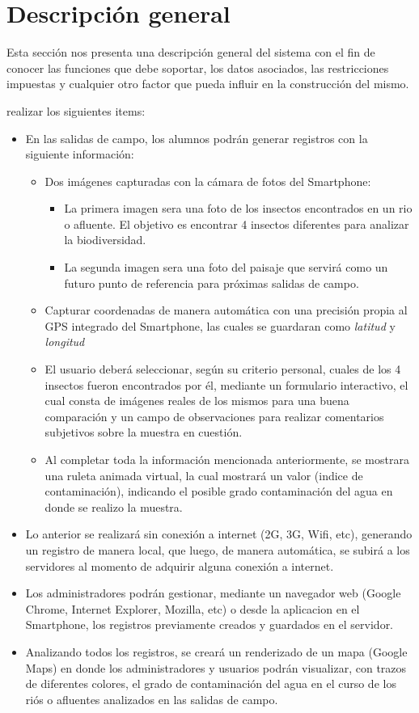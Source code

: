  \section{Descripción general}

    Esta sección nos presenta una descripción general del sistema con el fin de conocer las funciones que debe soportar, los datos asociados, las restricciones impuestas y cualquier otro factor que pueda influir en la construcción del mismo.

    realizar los siguientes items:
\begin{itemize}
    \item En las salidas de campo, los alumnos podrán generar registros con la siguiente información:
    \begin{itemize}
        \item Dos imágenes capturadas con la cámara de fotos del Smartphone:
        \begin{itemize}
            \item La primera imagen sera una foto de los insectos encontrados en un rio o afluente. El objetivo es encontrar 4 insectos diferentes para analizar la biodiversidad.
            \item La segunda imagen sera una foto del paisaje que servirá como un futuro punto de referencia para próximas salidas de campo. 
        \end{itemize}
        \item Capturar coordenadas de manera automática con una precisión propia al GPS integrado del Smartphone, las cuales se guardaran como \emph{latitud} y \emph{longitud}
        \item El usuario deberá seleccionar, según su criterio personal, cuales de los 4 insectos fueron encontrados por él, mediante un formulario interactivo, el cual consta de imágenes reales de los mismos para una buena comparación y un campo de observaciones para realizar comentarios subjetivos sobre la muestra en cuestión.
        \item Al completar toda la información mencionada anteriormente, se mostrara una ruleta animada virtual, la cual mostrará un valor (indice de contaminación), indicando el posible grado contaminación del agua en donde se realizo la muestra.
    \end{itemize}
    \item Lo anterior se realizará sin conexión a internet (2G, 3G, Wifi, etc), generando un registro de manera local, que luego, de manera automática, se subirá a los servidores al momento de adquirir alguna conexión a internet.
    \item Los administradores podrán gestionar, mediante un navegador web (Google Chrome, Internet Explorer, Mozilla, etc) o desde la aplicacion en el Smartphone, los registros previamente creados y guardados en el servidor. 
    \item Analizando todos los registros, se creará un renderizado de un mapa  (Google Maps) en donde los administradores y usuarios podrán visualizar, con trazos de diferentes colores, el grado de contaminación del agua en el curso de los riós o afluentes analizados en las salidas de campo.
\end{itemize}
 

